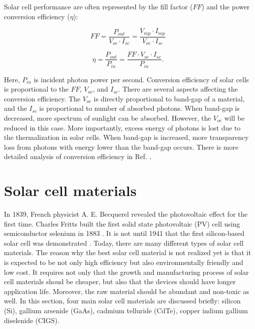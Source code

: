\documentclass[a4paper, 12pt, titlepage,oneside,drop]{kthesis}
\begin{document}
Solar cell performance are often represented by the fill factor ($FF$) and the power conversion efficiency ($\eta$):

\begin{equation}
FF = \frac{P_{out}}{V_{oc} \cdot I_{sc}} = \frac{V_{mp} \cdot I_{mp}}{V_{oc} \cdot I_{sc}}
\end{equation}

\begin{equation}
\eta = \frac{P_{out}}{P_{in}} = \frac{FF \cdot V_{oc} \cdot I_{sc}}{P_{in}}.
\end{equation}


Here, $P_{in}$ is incident photon power per second. Conversion efficiency of solar cells is proportional to the $FF$, $V_{oc}$, and $I_{sc}$. There are several aspects affecting
the conversion efficiency. The $V_{oc}$ is directly proportional to band-gap of a material, and the $I_{sc}$ is proportional to number of absorbed photons. When band-gap is decreased, more spectrum of sunlight can be absorbed.
However, the $V_{oc}$ will be reduced in this case. More importantly, excess energy of photons is lost due to the thermalization in solar cells. When band-gap is increased, more transparency loss from photons with energy lower than
the band-gap occurs. There is more detailed analysis of conversion efficiency in Ref. \cite{bok1}.


\section{Solar cell materials}

In 1839, French physicist A. E. Becquerel \cite{Becquerel} revealed the photovoltaic effect for the first time. Charles Fritts built the first solid state photovoltaic (PV) cell using semiconductor selenium in 
1883 \cite{etgar2013semiconductor,gourdin2007solar}. It is not until 1941 that
the first silicon-based solar cell was demonstrated \cite{1941ohl1, 1941ohl2}. Today, there are many different types of solar cell materials. The reason why the best solar cell material is not realized yet is that it is expected to be not only high efficiency but 
also environmentally friendly and low cost. It requires not only that the growth and manufacturing process of solar cell materials shoud be cheaper, but also that the devices should have longer application life. Moreover, the raw material
should be abundant and non-toxic as well. In this section, four main solar cell materials are discussed briefly: silicon (Si), gallium arsenide (GaAs), cadmium telluride (CdTe), copper indium gallium diselenide (CIGS).
\end{document}
